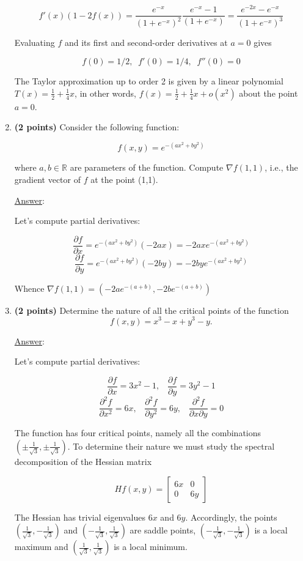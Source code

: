\documentclass[]{book}
\theoremstyle{definition}
\newcommand\ans{\underline{Answer}: }
\begin{document}
\begin{enumerate}
\[
f'(x) (1 - 2f(x)) = \frac{e^{-x}}{(1 + e^{-x})^2} \frac{e^{-x} - 1}{(1+e^{-x})} = \frac{e^{-2x} - e^{-x}}{(1+e^{-x})^3}
\]

Evaluating $f$ and its first and second-order derivatives at $a=0$ gives

\[
f(0) = 1/2,\;\; f'(0) = 1/4, \;\; f''(0) = 0
\]

The Taylor approximation up to order 2 is given by a linear polynomial $T(x) = \frac{1}{2} + \frac{1}{4}x$, in other words, $f(x) = \frac{1}{2} + \frac{1}{4}x + o(x^2)$ about the point $a=0$.



\item {\bf (2 points)} Consider the following function:

\[
f(x,y) = e^{-(ax^2+by^2)}
\]

where $a,b\in\mathbb{R}$ are parameters of the function. Compute $\nabla f (1,1)$, i.e., the gradient vector of $f$ at the point (1,1).

\ans

Let's compute partial derivatives:

\[
\frac{\partial f}{\partial x} =  e^{-(ax^2+by^2)} (-2ax) = -2axe^{-(ax^2+by^2)}
\]
\[
\frac{\partial f}{\partial y} =  e^{-(ax^2+by^2)} (-2by) = -2bye^{-(ax^2+by^2)}
\]

Whence  $\nabla f (1,1) = (-2ae^{-(a+b)}, -2be^{-(a+b)})$


\item {\bf (2 points)} Determine the nature of all the critical points of the function
\[
f(x, y) = x^3 - x + y^3 - y.
\]

\ans

Let's compute partial derivatives:

\[
\frac{\partial f}{\partial x} =  3x^2 - 1, \;\;\; \frac{\partial f}{\partial y} =  3y^2 - 1
\]
\[
\frac{\partial^2 f}{\partial x^2} =  6x, \;\;\; \frac{\partial^2 f}{\partial y^2} =  6y, \;\;\; \frac{\partial^2 f}{\partial x \partial y} = 0
\]

The function has four critical points, namely all the combinations $(\pm \frac{1}{\sqrt{3}}, \pm \frac{1}{\sqrt{3}})$. To determine their nature we must study the spectral decomposition of the Hessian matrix

\[
Hf(x,y) = \begin{bmatrix}
6x & 0 \\
0 & 6y
\end{bmatrix}
\]

The Hessian has trivial eigenvalues $6x$ and $6y$. Accordingly, the points $(\frac{1}{\sqrt{3}}, -\frac{1}{\sqrt{3}})$ and $(-\frac{1}{\sqrt{3}}, \frac{1}{\sqrt{3}})$ are saddle points, $(-\frac{1}{\sqrt{3}}, -\frac{1}{\sqrt{3}})$ is a local maximum and $(\frac{1}{\sqrt{3}}, \frac{1}{\sqrt{3}})$ is a local minimum.




\end{enumerate}
\end{document}
